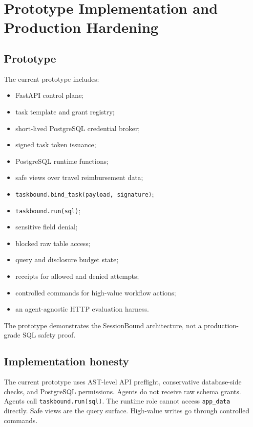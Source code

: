 \documentclass[journal]{IEEEtran}
\providecommand{\tightlist}{%
  \setlength{\itemsep}{0pt}\setlength{\parskip}{0pt}}
\begin{document}
\hypertarget{prototype-implementation-and-production-hardening}{%
\section{Prototype Implementation and Production
Hardening}\label{prototype-implementation-and-production-hardening}}

\hypertarget{prototype}{%
\subsection{Prototype}\label{prototype}}

The current prototype includes:

\begin{itemize}
\tightlist
\item
  FastAPI control plane;
\item
  task template and grant registry;
\item
  short-lived PostgreSQL credential broker;
\item
  signed task token issuance;
\item
  PostgreSQL runtime functions;
\item
  safe views over travel reimbursement data;
\item
  \texttt{taskbound.bind\_task(payload,\ signature)};
\item
  \texttt{taskbound.run(sql)};
\item
  sensitive field denial;
\item
  blocked raw table access;
\item
  query and disclosure budget state;
\item
  receipts for allowed and denied attempts;
\item
  controlled commands for high-value workflow actions;
\item
  an agent-agnostic HTTP evaluation harness.
\end{itemize}

The prototype demonstrates the SessionBound architecture, not a
production-grade SQL safety proof.

\hypertarget{implementation-honesty}{%
\subsection{Implementation
honesty}\label{implementation-honesty}}

The current prototype uses AST-level API preflight, conservative
database-side checks, and PostgreSQL permissions. Agents do not receive
raw schema grants. Agents call \texttt{taskbound.run(sql)}. The runtime
role cannot access \texttt{app\_data} directly. Safe views are the query
surface. High-value writes go through controlled commands.
\end{document}
